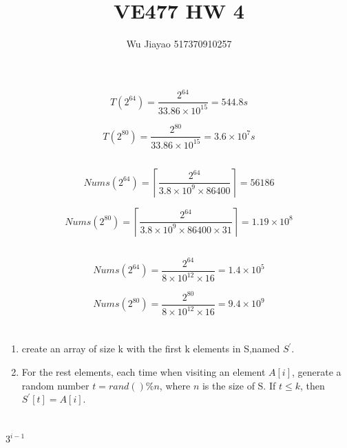 \documentclass[12pt,a4paper]{article}
\title{VE477 HW 4}
\author{Wu Jiayao 517370910257}
\theoremstyle{definition}
\begin{document}
\maketitle

\section{}
\subsection{}
$$
T(2^{64})=\frac{2^{64}}{33.86 \times 10^{15}}=544.8 s 
$$

$$
T(2^{80})=\frac{2^{80}}{33.86 \times 10^{15}}=3.6 \times 10^{7}s
$$

\subsection{}
$$
Nums\left(2^{64}\right)=\left\lceil\frac{2^{64}}{3.8 \times 10^{9} \times 86400}\right\rceil= 56186
$$

$$
Nums\left(2^{80}\right)=\left\lceil\frac{2^{64}}{3.8 \times 10^{9} \times 86400 \times 31}\right\rceil= 1.19 \times 10^{8}
$$

\subsection{}
$$
Nums(2^{64}) = \frac{2^{64}}{8 \times 10^{12} \times 16}=1.4 \times 10^{5}
$$

$$
Nums(2^{80}) = \frac{2^{80}}{8 \times 10^{12} \times 16}=9.4 \times 10^{9}
$$

\section{}
\begin{enumerate}
    \item create an array of size k with the first k elements in S,named $S^{'}$.
    \item For the rest elements, each time when visiting an element $A[i]$, generate a random number $t = rand()\%n$, where $n$ is the size of S. If $t \leq k$, then $S^{'}[t]=A[i]$.
\end{enumerate}
\section{}
\subsection{}
\begin{algorithm}[H]
\Return $3^{i-1}$
\end{algorithm}
\end{document}
